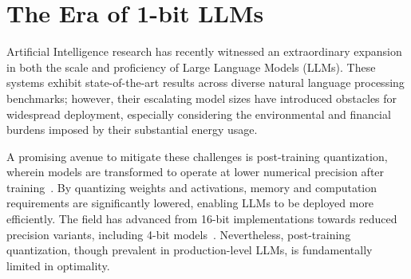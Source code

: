 \begin{abstract}
Recent advances, exemplified by BitNet~\cite{bitnet}, are ushering in a new generation of 1-bit Large Language Models (LLMs). In this paper, we propose a novel 1-bit LLM variant, designated as \textbf{}, where each parameter (or weight) assumes ternary values from \{-1, 0, 1\}. This model is able to attain parity with its full-precision counterparts (i.e., FP16 or BF16 Transformer LLMs) of equivalent architecture and token count, achieving similar perplexity and downstream task results. Importantly, this 1.58-bit configuration yields dramatic reductions in latency, memory footprint, computational throughput, and energy demands, thereby delivering substantial improvements in efficiency. On a deeper level, the 1.58-bit LLM offers a fresh scaling law and a training strategy that enables future LLM generations to reach both high performance and heightened cost-effectiveness. Additionally, this innovation facilitates novel computational frameworks and catalyzes the development of specialized hardware tailored for 1-bit LLM workloads.
\end{abstract}

\section{The Era of 1-bit LLMs}

Artificial Intelligence research has recently witnessed an extraordinary expansion in both the scale and proficiency of Large Language Models (LLMs). These systems exhibit state-of-the-art results across diverse natural language processing benchmarks; however, their escalating model sizes have introduced obstacles for widespread deployment, especially considering the environmental and financial burdens imposed by their substantial energy usage.

A promising avenue to mitigate these challenges is post-training quantization, wherein models are transformed to operate at lower numerical precision after training~\cite{smoothquant, gptq, quip, quip_sharp}. By quantizing weights and activations, memory and computation requirements are significantly lowered, enabling LLMs to be deployed more efficiently. The field has advanced from 16-bit implementations towards reduced precision variants, including 4-bit models~\cite{gptq, awq}. Nevertheless, post-training quantization, though prevalent in production-level LLMs, is fundamentally limited in optimality.

